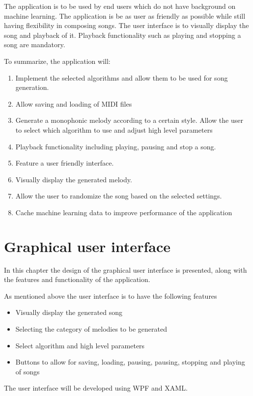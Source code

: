 The application is to be used by end users which do not have background on machine learning. The application is be as user as friendly as possible while still having flexibility in composing songs. The user interface is to visually display the song and playback of it. Playback functionality such as playing and stopping a song are mandatory.

To summarize, the application will:
\begin{enumerate}
\item Implement the selected algorithms and allow them to be used for song generation.
\item Allow saving and loading of \ac{MIDI} files
\item Generate a monophonic melody according to a certain style. Allow the user to select which algorithm to use and adjust high level parameters
\item Playback functionality including playing, pausing and stop a song. 
\item Feature a user friendly interface.
\item Visually display the generated melody.
\item Allow the user to randomize the song based on the selected settings.
\item Cache machine learning data to improve performance of the application
\end{enumerate}

\chapter{Graphical user interface}
In this chapter the design of the graphical user interface is presented, along with the features and functionality of the application.

As mentioned above the user interface is to have the following features
\begin{itemize}
\item Visually display the generated song
\item Selecting the category of melodies to be generated
\item Select algorithm and high level parameters
\item Buttons to allow for saving, loading, pausing, pausing, stopping and playing of songs
\end{itemize}

The user interface will be developed using \ac{WPF} and \ac{XAML}.

